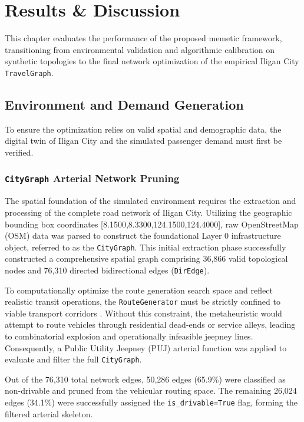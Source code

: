 
\chapter{Results \& Discussion}
\noindent
This chapter evaluates the performance of the proposed memetic framework, transitioning from environmental validation and algorithmic calibration on synthetic topologies to the final network optimization of the empirical Iligan City \texttt{TravelGraph}.

\section{Environment and Demand Generation}
\noindent
To ensure the optimization relies on valid spatial and demographic data, the digital twin of Iligan City and the simulated passenger demand must first be verified.

\subsection{\texttt{CityGraph} Arterial Network Pruning}
The spatial foundation of the simulated environment requires the extraction and processing of the complete road network of Iligan City. Utilizing the geographic bounding box coordinates [8.1500,8.3300,124.1500,124.4000], raw OpenStreetMap (OSM) data was parsed to construct the foundational Layer 0 infrastructure object, referred to as the \texttt{CityGraph}. This initial extraction phase successfully constructed a comprehensive spatial graph comprising 36,866 valid topological nodes and 76,310 directed bidirectional edges (\texttt{DirEdge}).

To computationally optimize the route generation search space and reflect realistic transit operations, the \texttt{RouteGenerator} must be strictly confined to viable transport corridors
. Without this constraint, the metaheuristic would attempt to route vehicles through residential dead-ends or service alleys, leading to combinatorial explosion and operationally infeasible jeepney lines. Consequently, a Public Utility Jeepney (PUJ) arterial function was applied to evaluate and filter the full \texttt{CityGraph}. 

Out of the 76,310 total network edges, 50,286 edges (65.9\%) were classified as non-drivable and pruned from the vehicular routing space. The remaining 26,024 edges (34.1\%) were successfully assigned the \texttt{is\_drivable=True} flag, forming the filtered arterial skeleton.

